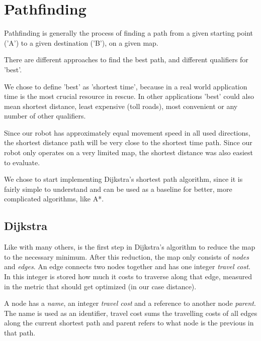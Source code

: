 \chapter{Pathfinding}\label{ch:path}
Pathfinding is generally the process of finding a path from a given starting point ('A')
to a given destination ('B'),
on a given map.

There are different approaches to find the best path,
and different qualifiers for 'best'.

We chose to define 'best' as 'shortest time',
because in a real world application time is the most crucial resource in rescue.
In other applications 'best' could also mean shortest distance, least expensive (toll roads),
most convenient or any number of other qualifiers.

Since our robot has approximately equal movement speed in all used directions,
the shortest distance path will be very close to the shortest time path.
Since our robot only operates on a very limited map,
the shortest distance was also easiest to evaluate.

We chose to start implementing Dijkstra's shortest path algorithm,
since it is fairly simple to understand
and can be used as a baseline for better, more complicated algorithms,
like A*.

\section{Dijkstra}
Like with many others,
is the first step in Dijkstra's algorithm to reduce the map to the necessary minimum.
After this reduction, the map only consists of \emph{nodes} and \emph{edges}.
An edge connects two nodes together and has one integer \emph{travel cost}.
In this integer is stored how much it costs to traverse along that edge,
measured in the metric that should get optimized (in our case distance).

A node has a \emph{name}, an integer \emph{travel cost} and a reference to another node \emph{parent}.
The name is used as an identifier,
travel cost sums the travelling costs of all edges along the current shortest path
and parent refers to what node is the previous in that path.

\cite{Pound2017}

